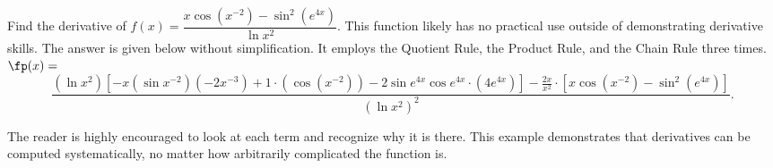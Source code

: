 
\begin{example}\label{ex_chain5}
Find the derivative of $f(x)=\dfrac{x\cos(x^{-2})-\sin^2(e^{4x})}{\ln x^2}$.
\solution
This function likely has no practical use outside of demonstrating derivative skills. The answer is given below without simplification. It employs the Quotient Rule, the Product Rule, and the Chain Rule three times.\\
\scriptsize
$\fp(x) = $
\[
 \dfrac{(\ln x^2)[-x(\sin x^{-2})(-2x^{-3}) + 1\cdot (\cos (x^{-2})) -2 \sin e^{4x} \cos e^{4x} \cdot (4e^{4x})] - \frac{2x}{x^2} \cdot [x\cos (x^{-2}) -\sin^2(e^{4x})]}
 {(\ln x^2)^2}.
\]%
\normalsize

The reader is highly encouraged to look at each term and recognize why it is there. %
This example demonstrates that derivatives can be computed systematically, no matter how arbitrarily complicated the function is.
\end{example}

